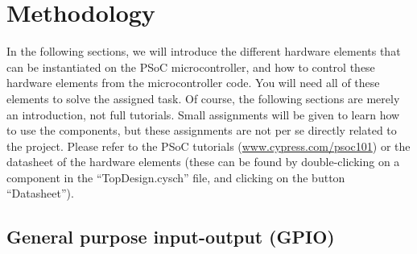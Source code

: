 \section{Methodology}

In the following sections, we will introduce the different hardware elements that can be instantiated on the PSoC microcontroller, and how to control these hardware elements from the microcontroller code. You will need all of these elements to solve the assigned task. Of course, the following sections are merely an introduction, not full tutorials. Small assignments will be given to learn how to use the components, but these assignments are not per se directly related to the project. Please refer to the PSoC tutorials (\url{www.cypress.com/psoc101}) or the datasheet of the hardware elements (these can be found by double-clicking on a component in the ``TopDesign.cysch'' file, and clicking on the button ``Datasheet''). 





\newpage
\subsection{General purpose input-output (GPIO)}


